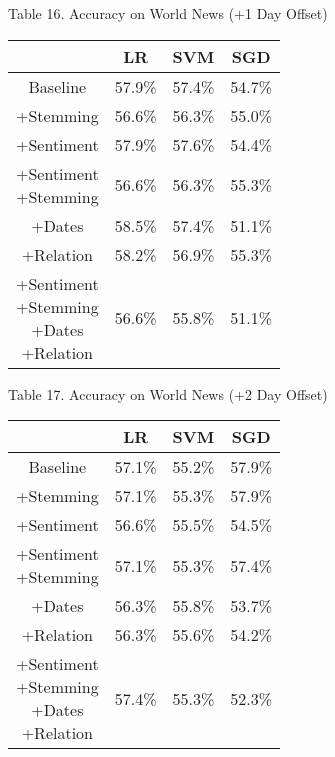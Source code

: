 \documentclass[11pt,a4paper]{article}
\begin{document}
\begin{center}
Table 16. Accuracy on World News (+1 Day Offset)\\
\begin{tabular}{ |c|c|c|c| }
 \hline
  & LR & SVM & SGD \\
  \hline
  Baseline & 57.9\% & 57.4\% & 54.7\% \\
  \hline
 +Stemming & 56.6\% & 56.3\% & 55.0\% \\
  \hline
 +Sentiment & 57.9\% & 57.6\% & 54.4\% \\
  \hline
  \shortstack{+Sentiment \\ +Stemming} & 56.6\% & 56.3\% & 55.3\%\\
 \hline
 +Dates & 58.5\% & 57.4\% & 51.1\% \\
  \hline
 +Relation & 58.2\% & 56.9\% & 55.3\% \\
  \hline
  \shortstack{+Sentiment \\ +Stemming \\+Dates \\+Relation} & 56.6\% & 55.8\% & 51.1\% \\
 \hline
\end{tabular}
\end{center}

\begin{center}
Table 17. Accuracy on World News (+2 Day Offset)\\
\begin{tabular}{ |c|c|c|c| }
 \hline
  & LR & SVM & SGD \\
  \hline
  Baseline & 57.1\% & 55.2\% & 57.9\% \\
  \hline
 +Stemming & 57.1\% & 55.3\% & 57.9\% \\
  \hline
 +Sentiment & 56.6\% & 55.5\% & 54.5\% \\
  \hline
  \shortstack{+Sentiment \\ +Stemming} & 57.1\% & 55.3\% & 57.4\%\\
 \hline
 +Dates & 56.3\% & 55.8\% & 53.7\% \\
  \hline
 +Relation & 56.3\% & 55.6\% & 54.2\% \\
  \hline
  \shortstack{+Sentiment \\ +Stemming \\+Dates \\+Relation} & 57.4\% & 55.3\% & 52.3\% \\
 \hline
\end{tabular}
\end{center}
\end{document}
